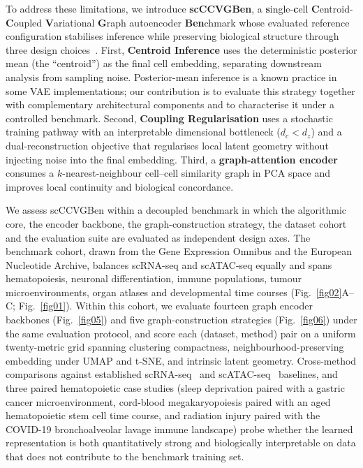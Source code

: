 \documentclass[referee, pdflatex, sn-vancouver-num]{sn-jnl}
\begin{document}
To address these limitations, we introduce \textbf{scCCVGBen}, a \textbf{s}ingle-\textbf{c}ell \textbf{C}entroid-\textbf{C}oupled \textbf{V}ariational \textbf{G}raph autoencoder \textbf{Ben}chmark whose evaluated reference configuration stabilises inference while preserving biological structure through three design choices~\cite{kipf2016vgae,kingma2014vae,velickovic2018gat}. First, \textbf{Centroid Inference} uses the deterministic posterior mean (the ``centroid'') as the final cell embedding, separating downstream analysis from sampling noise. Posterior-mean inference is a known practice in some VAE implementations; our contribution is to evaluate this strategy together with complementary architectural components and to characterise it under a controlled benchmark. Second, \textbf{Coupling Regularisation} uses a stochastic training pathway with an interpretable dimensional bottleneck ($d_c < d_z$) and a dual-reconstruction objective that regularises local latent geometry without injecting noise into the final embedding. Third, a \textbf{graph-attention encoder} consumes a $k$-nearest-neighbour cell--cell similarity graph in PCA space and improves local continuity and biological concordance.

We assess scCCVGBen within a decoupled benchmark in which the algorithmic core, the encoder backbone, the graph-construction strategy, the dataset cohort and the evaluation suite are evaluated as independent design axes. The benchmark cohort, drawn from the Gene Expression Omnibus and the European Nucleotide Archive, balances scRNA-seq and scATAC-seq equally and spans hematopoiesis, neuronal differentiation, immune populations, tumour microenvironments, organ atlases and developmental time courses (Fig.~\ref{fig02}A--C; Fig.~\ref{fig01}). Within this cohort, we evaluate fourteen graph encoder backbones (Fig.~\ref{fig05}) and five graph-construction strategies (Fig.~\ref{fig06}) under the same evaluation protocol, and score each (dataset, method) pair on a uniform twenty-metric grid spanning clustering compactness, neighbourhood-preserving embedding under UMAP and t-SNE, and intrinsic latent geometry. Cross-method comparisons against established scRNA-seq~\cite{higgins2017betavae,chen2018isolating,kim2018disentangling} and scATAC-seq~\cite{stuart2021atac,ashuach2022peakvi,martens2024poissonvi} baselines, and three paired hematopoietic case studies (sleep deprivation paired with a gastric cancer microenvironment, cord-blood megakaryopoiesis paired with an aged hematopoietic stem cell time course, and radiation injury paired with the COVID-19 bronchoalveolar lavage immune landscape) probe whether the learned representation is both quantitatively strong and biologically interpretable on data that does not contribute to the benchmark training set.
\end{document}
